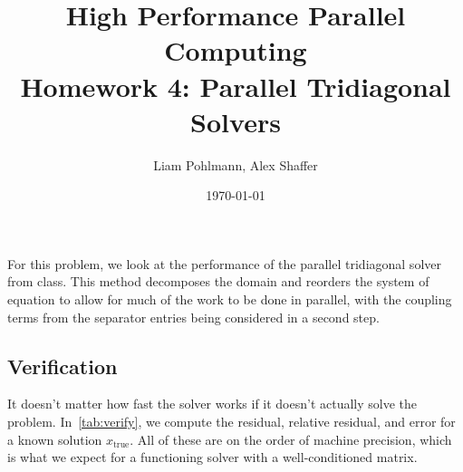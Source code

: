\documentclass[11pt]{article}
\title{\textbf{High Performance Parallel Computing \\ Homework 4: Parallel Tridiagonal Solvers}}
\author{Liam Pohlmann, Alex Shaffer}
\date{\today}
\begin{document}
\maketitle

For this problem, we look at the performance of the parallel tridiagonal solver from class.
This method decomposes the domain and reorders the system of equation to allow for much of the work to be done in parallel, with the coupling terms from the separator entries being considered in a second step.


\subsection*{Verification}
It doesn't matter how fast the solver works if it doesn't actually solve the problem.
In~\cref{tab:verify}, we compute the residual, relative residual, and error for a known solution $x_{\text{true}}$.
All of these are on the order of machine precision, which is what we expect for a functioning solver with a well-conditioned matrix.
\end{document}
